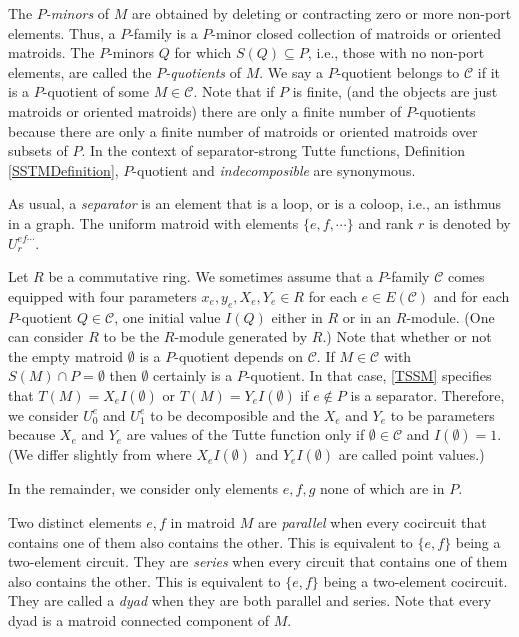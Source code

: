 \documentclass[12pt,leqno]{amsart}
\theoremstyle{remark}
\begin{document}
The \emph{$P$-minors} of $M$ are
obtained
by deleting or contracting zero or more non-port elements.
Thus, a $P$-family is 
a $P$-minor closed collection of matroids or oriented matroids.
The $P$-minors $Q$ for which $S(Q)\subseteq P$,
i.e., those with no non-port elements, are called the \emph{$P$-quotients}
of $M$.  We say a $P$-quotient belongs to $\mathcal{C}$ if it is a
$P$-quotient of some $M\in\mathcal{C}$.  Note that if $P$ is finite,
(and the objects are just matroids or oriented matroids)
there are only a finite number of $P$-quotients because there are 
only a finite number of matroids or oriented matroids over subsets
of $P$.  In the context of separator-strong Tutte functions,
Definition \ref{SSTMDefinition}, $P$-quotient and \emph{indecomposible}
are synonymous.

As usual, a \emph{separator} is an element that is a loop,  or is
a coloop, i.e., an isthmus in a graph.
The uniform matroid with elements $\{e, f, \cdots \}$ and rank $r$ is denoted
by $U^{ef\cdots}_r$.

Let $R$ be a commutative ring.
We sometimes assume that a $P$-family $\mathcal{C}$ comes equipped
with four parameters $x_e,y_e,X_e,Y_e\in R$ for each 
$e\in E(\mathcal{C})$ and for each $P$-quotient $Q\in\mathcal{C}$,
one initial value $I(Q)$ either in $R$ 
or in an $R$-module.  (One can consider $R$ to be
the $R$-module generated by $R$.)
Note that whether or
not the empty matroid $\emptyset$ is a $P$-quotient depends on
$\mathcal{C}$.  If $M\in\mathcal{C}$ with
$S(M)\cap P=\emptyset$ then $\emptyset$ certainly is a $P$-quotient.
In that case, \eqref{TSSM} specifies that $T(M) = X_e I(\emptyset)$
or $T(M) =Y_e I(\emptyset)$ if $e\not\in P$ is a separator.
Therefore,
we consider $U^e_0$ and $U^e_1$ to be decomposible
and the $X_e$ and $Y_e$ to be parameters
because $X_e$ and $Y_e$ are values of the Tutte function
only if $\emptyset\in \mathcal{C}$ and $I(\emptyset)=1$.
(We differ slightly from \cite{MR93a:05047} where $X_e I(\emptyset)$ and 
$Y_e I(\emptyset)$ are called point values.)

In the remainder, we consider only elements $e, f, g$ none of 
which are in $P$.

Two distinct elements $e,f$ in matroid $M$
are \emph{parallel} when
every cocircuit that contains one of them also contains the other.  This
is equivalent to $\{e, f\}$ being a two-element circuit.
They are \emph{series} when every circuit that contains one of them
also contains the other.  This is equivalent to $\{e, f\}$ being a two-element
cocircuit.
They are called a \emph{dyad} when 
they are both parallel and series.  Note that every 
dyad is a matroid connected
component of $M$.
\end{document}
